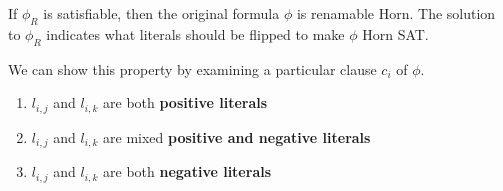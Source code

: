 \begin{enumerate}[label=(\alph*)]
    If $\phi_R$ is satisfiable, then the original formula $\phi$ is renamable Horn. The solution to $\phi_R$ indicates what literals should be flipped to make $\phi$ Horn SAT.

    We can show this property by examining a particular clause $c_i$ of $\phi$.
    \begin{enumerate}
      \item $l_{i,j}$ and $l_{i,k}$ are both \textbf{positive literals}
      \item $l_{i,j}$ and $l_{i,k}$ are mixed \textbf{positive and negative literals}
      \item $l_{i,j}$ and $l_{i,k}$ are both \textbf{negative literals}
    \end{enumerate}

\end{enumerate}

